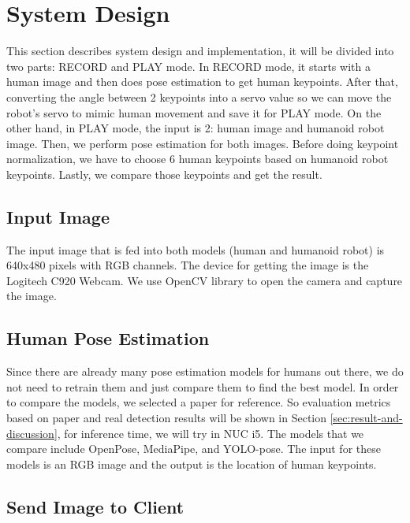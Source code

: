 \section{System Design}
\label{sec:systemdesign}

This section describes system design and implementation, it will be divided into two parts: RECORD and PLAY mode.
In RECORD mode, it starts with a human image and then does pose estimation to get human keypoints. After that, converting the angle between 2 keypoints into a servo value
so we can move the robot's servo to mimic human movement and save it for PLAY mode.
On the other hand, in PLAY mode, the input is 2: human image and humanoid robot image. Then, we perform pose estimation for both images. Before doing keypoint normalization,
we have to choose 6 human keypoints based on humanoid robot keypoints. Lastly, we compare those keypoints and get the result.


\subsection{Input Image}
\label{subsec:input-image}

The input image that is fed into both models (human and humanoid robot) is 640x480 pixels with RGB channels. The device for getting the image is the Logitech C920 Webcam. We use OpenCV library to open the camera and capture the image.


\subsection{Human Pose Estimation}
\label{subsec:human-pose-estimation}

Since there are already many pose estimation models for humans out there, we do not need to retrain them and just compare them to find the best model. In order to compare the models, we selected a paper for reference.
So evaluation metrics based on paper and real detection results will be shown in Section \ref{sec:result-and-discussion}, for inference time, we will try in NUC i5. The models that we compare include OpenPose, MediaPipe, and YOLO-pose.
The input for these models is an RGB image and the output is the location of human keypoints.


\subsection{Send Image to Client}
\label{subsec:send-image-to-client}

